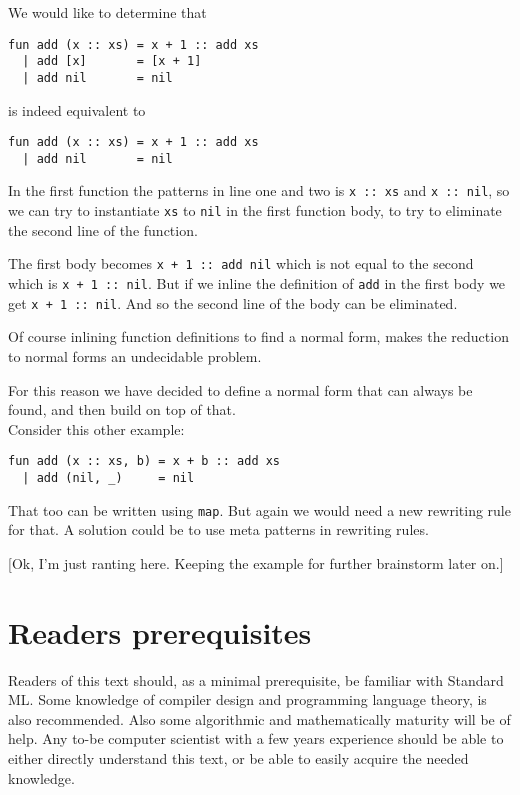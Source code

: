 We would like to determine that
\begin{lstlisting}
fun add (x :: xs) = x + 1 :: add xs
  | add [x]       = [x + 1]
  | add nil       = nil
\end{lstlisting}
is indeed equivalent to
\begin{lstlisting}
fun add (x :: xs) = x + 1 :: add xs
  | add nil       = nil
\end{lstlisting}
In the first function the patterns in line one and two is \texttt{x :: xs} and
\texttt{x :: nil}, so we can try to instantiate \texttt{xs} to \texttt{nil} in
the first function body, to try to eliminate the second line of the function.

The first body becomes \texttt{x + 1 :: add nil} which is not equal to the
second which is \texttt{x + 1 :: nil}. But if we inline the definition of
\texttt{add} in the first body we get \texttt{x + 1 :: nil}. And so the second
line of the body can be eliminated.

Of course inlining function definitions to find a normal form, makes the
reduction to normal forms an undecidable problem.

For this reason we have decided to define a normal form that can always be
found, and then build on top of that.\\[1em]

Consider this other example:
\begin{lstlisting}
fun add (x :: xs, b) = x + b :: add xs
  | add (nil, _)     = nil
\end{lstlisting}
That too can be written using \texttt{map}. But again we would need a new
rewriting rule for that. A solution could be to use meta patterns in rewriting
rules.

[Ok, I'm just ranting here. Keeping the example for further brainstorm later on.]

\section{Readers prerequisites}


Readers of this text should, as a minimal prerequisite, be familiar with
Standard ML. Some knowledge of compiler design and programming language theory,
is also recommended. Also some algorithmic and mathematically maturity will be
of help. Any to-be computer scientist with a few years experience should be able
to either directly understand this text, or be able to easily acquire the needed
knowledge.





